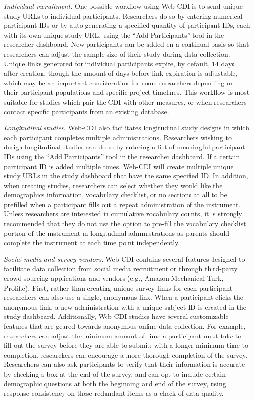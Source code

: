 \documentclass[
  english,
  man]{apa7}
\begin{document}
\emph{Individual recruitment.} One possible workflow using Web-CDI is to send unique study URLs to individual participants. Researchers do so by entering numerical participant IDs or by auto-generating a specified quantity of participant IDs, each with its own unique study URL, using the \enquote{Add Participants} tool in the researcher dashboard. New participants can be added on a continual basis so that researchers can adjust the sample size of their study during data collection. Unique links generated for individual participants expire, by default, 14 days after creation, though the amount of days before link expiration is adjustable, which may be an important consideration for some researchers depending on their participant populations and specific project timelines. This workflow is most suitable for studies which pair the CDI with other measures, or when researchers contact specific participants from an existing database.

\emph{Longitudinal studies.} Web-CDI also facilitates longitudinal study designs in which each participant completes multiple administrations. Researchers wishing to design longitudinal studies can do so by entering a list of meaningful participant IDs using the \enquote{Add Participants} tool in the researcher dashboard. If a certain participant ID is added multiple times, Web-CDI will create multiple unique study URLs in the study dashboard that have the same specified ID. In addition, when creating studies, researchers can select whether they would like the demographics information, vocabulary checklist, or no sections at all to be prefilled when a participant fills out a repeat administration of the instrument. Unless researchers are interested in cumulative vocabulary counts, it is strongly recommended that they do not use the option to pre-fill the vocabulary checklist portion of the instrument in longitudinal administrations as parents should complete the instrument at each time point independently.

\emph{Social media and survey vendors.} Web-CDI contains several features designed to facilitate data collection from social media recruitment or through third-party crowd-sourcing applications and vendors (e.g., Amazon Mechanical Turk, Prolific). First, rather than creating unique survey links for each participant, researchers can also use a single, anonymous link. When a participant clicks the anonymous link, a new administration with a unique subject ID is created in the study dashboard. Additionally, Web-CDI studies have several customizable features that are geared towards anonymous online data collection. For example, researchers can adjust the minimum amount of time a participant must take to fill out the survey before they are able to submit; with a longer minimum time to completion, researchers can encourage a more thorough completion of the survey. Researchers can also ask participants to verify that their information is accurate by checking a box at the end of the survey, and can opt to include certain demographic questions at both the beginning and end of the survey, using response consistency on these redundant items as a check of data quality.
\end{document}
